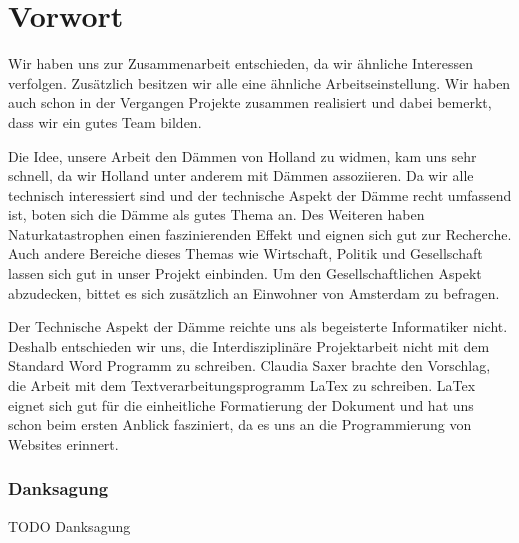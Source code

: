 \part{Vorwort}

Wir haben uns zur Zusammenarbeit entschieden, da wir ähnliche Interessen verfolgen.
Zusätzlich besitzen wir alle eine ähnliche Arbeitseinstellung. 
Wir haben auch schon in der Vergangen Projekte zusammen realisiert und dabei bemerkt, dass wir ein gutes Team bilden.
 
Die Idee, unsere Arbeit den Dämmen von Holland zu widmen, kam uns sehr schnell, da wir Holland unter anderem mit Dämmen assoziieren.
Da wir alle technisch interessiert sind und der technische Aspekt der Dämme recht umfassend ist, boten sich die Dämme als gutes Thema an. 
Des Weiteren haben Naturkatastrophen einen faszinierenden Effekt und eignen sich gut zur Recherche.
Auch andere Bereiche dieses Themas wie Wirtschaft, Politik und Gesellschaft lassen sich gut in unser Projekt einbinden. 
Um den Gesellschaftlichen Aspekt abzudecken, bittet es sich zusätzlich an Einwohner von Amsterdam zu befragen.

Der Technische Aspekt der Dämme reichte uns als begeisterte Informatiker nicht. Deshalb entschieden wir uns, die Interdisziplinäre 
Projektarbeit nicht mit dem Standard Word Programm zu schreiben. Claudia Saxer brachte den Vorschlag, die Arbeit mit dem Textverarbeitungsprogramm
LaTex zu schreiben. 
LaTex eignet sich gut für die einheitliche Formatierung der Dokument und hat uns schon beim ersten Anblick fasziniert, da es uns an die 
Programmierung  von Websites erinnert.


\section{Danksagung}
TODO
Danksagung

